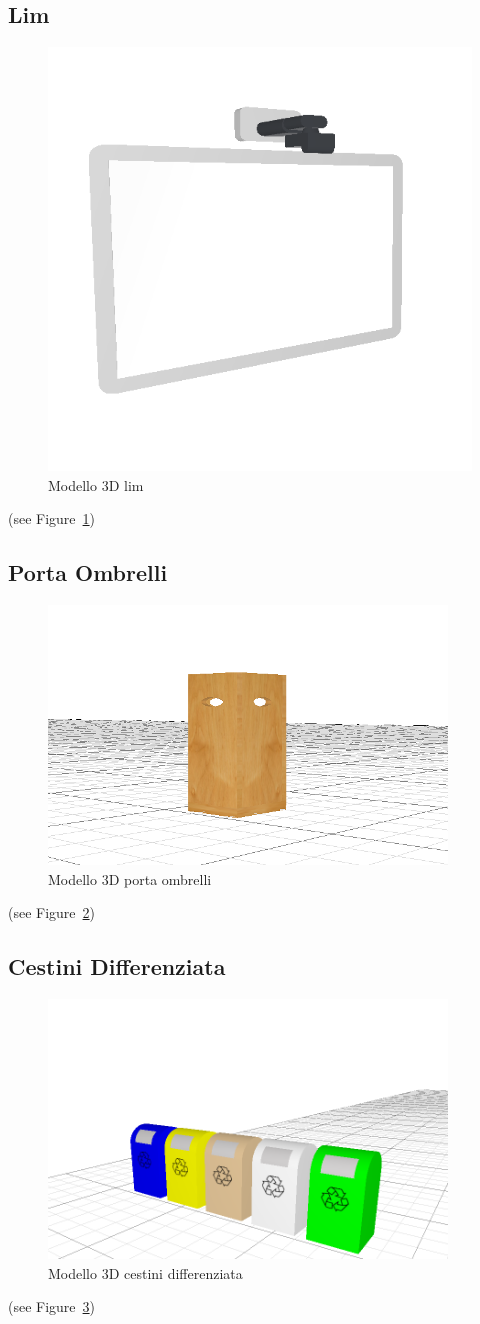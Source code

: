 \subsection*{Lim}
\begin{figure}[htbp] %
   \centering
   \includegraphics[width=0.5\linewidth]{images/lim}
   \caption{Modello 3D lim}
   \label{fig:lim}
   \end{figure}
   (see Figure~\ref{fig:lim})
   \newpage

\subsection*{Porta Ombrelli}
\begin{figure}[htbp] %
   \centering
   \includegraphics[width=0.5\linewidth]{images/portaombrelli}
   \caption{Modello 3D porta ombrelli}
   \label{fig:portaombrelli}
   \end{figure}
   (see Figure~\ref{fig:portaombrelli})
   \newpage

\subsection*{Cestini Differenziata}
\begin{figure}[htbp] %
   \centering
   \includegraphics[width=0.5\linewidth]{images/recycling-bins}
   \caption{Modello 3D cestini differenziata}
   \label{fig:differenziata}
   \end{figure}
   (see Figure~\ref{fig:differenziata})
   \newpage

